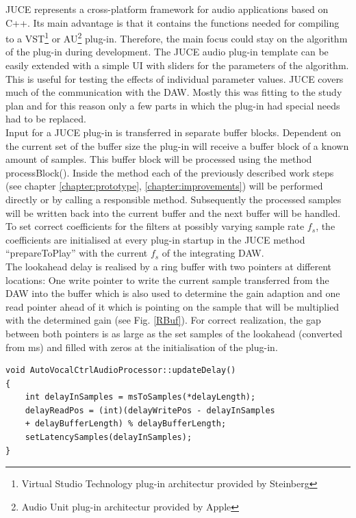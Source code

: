 JUCE represents a cross-platform framework for audio applications based on C++. Its main advantage is that it contains the functions needed for compiling to a VST\footnote{Virtual Studio Technology plug-in architectur provided by Steinberg} or AU\footnote{Audio Unit plug-in architectur provided by Apple} plug-in. Therefore, the main focus could stay on the algorithm of the plug-in during development. The JUCE audio plug-in template can be easily extended with a simple UI with sliders for the parameters of the algorithm. This is useful for testing the effects of individual parameter values. JUCE covers much of the communication with the DAW. Mostly this was fitting to the study plan and for this reason only a few parts in which the plug-in had special needs had to be replaced.\\
Input for a JUCE plug-in is transferred in separate buffer blocks. Dependent on the current set of the buffer size the plug-in will receive a buffer block of a known amount of samples. This buffer block will be processed using the method processBlock(). Inside the method each of the previously described work steps (see chapter \ref{chapter:prototype}, \ref{chapter:improvements}) will be performed directly or by calling a responsible method. Subsequently the processed samples will be written back into the current buffer and the next buffer will be handled.\\
To set correct coefficients for the filters at possibly varying sample rate $f_s$, the coefficients are initialised at every plug-in startup in the JUCE method “prepareToPlay” with the current $f_s$ of the integrating DAW.\\
The lookahead delay is realised by a ring buffer with two pointers at different locations: One write pointer to write the current sample transferred from the DAW into the buffer which is also used to determine the gain adaption and one read pointer ahead of it which is pointing on the sample that will be multiplied with the determined gain (see Fig. \ref{RBuf}). For correct realization, the gap between both pointers is as large as the set samples of the lookahead (converted from ms) and filled with zeros at the initialisation of the plug-in.\\

\begin{lstlisting}[frame=single]
void AutoVocalCtrlAudioProcessor::updateDelay()
{
    int delayInSamples = msToSamples(*delayLength);
    delayReadPos = (int)(delayWritePos - delayInSamples
    + delayBufferLength) % delayBufferLength;
    setLatencySamples(delayInSamples);
}
\end{lstlisting}

